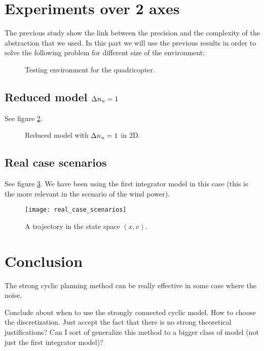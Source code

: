 \section{Experiments over 2 axes}
The previous study show the link between the precision and the complexity of the abstraction that we used.
In this part we will use the previous results in order to solve the following problem for different size of the environment:
\begin{figure}
	\center
	
	\caption{Testing environment for the quadricopter.}
	\label{fig:environment}
\end{figure}


\subsection{Reduced model $\Delta n_u = 1$}
See figure \ref{fig:double_reduce_2D}.

\begin{figure*}
	\center
	
	\caption{Reduced model with $\Delta n_u=1$ in 2D.}
	\label{fig:double_reduce_2D}
\end{figure*}


\subsection{Real case scenarios}
See figure \ref{fig:real_case}.
We have been using the first integrator model in this case (this is the more relevant in the scenario of the wind power).

\begin{figure}[!ht]
  \centering
  \texttt{[image: real\_case\_scenarios]}
  \caption{A trajectory in the state space $(x,v)$.}
  \label{fig:real_case}
\end{figure}

\section{Conclusion}
The strong cyclic planning method can be really effective in some case where the noise.

Conclude about when to use the strongly connected cyclic model.
How to choose the discretization.
Just accept the fact that there is no strong theoretical justifications?
Can I sort of generalize this method to a bigger class of model (not just the first integrator model)?

